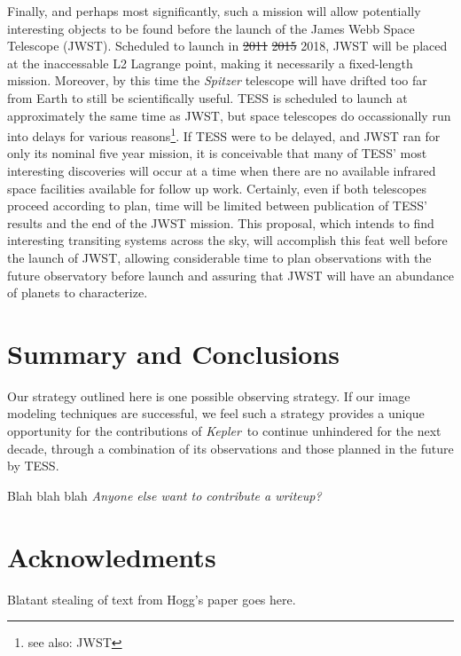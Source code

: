\documentclass[12pt, preprint]{aastex}
\newcommand{\observatory}[1]{\textsl{#1}}
\newcommand{\kepler}{\observatory{Kepler}}
\newcommand{\Kepler}{\kepler}
\begin{document}
Finally, and perhaps most significantly, such a mission will allow potentially 
 interesting objects to be found before the launch of the James Webb Space 
 Telescope (JWST). 
Scheduled to launch in \sout{2011} \sout{2015} 2018, JWST will be placed at 
 the inaccessable L2 Lagrange point, making it necessarily a fixed-length 
 mission. 
Moreover, by this time the \textit{Spitzer} telescope will have drifted too 
 far from Earth to still be scientifically useful.
TESS is scheduled to launch at approximately the same time as JWST, but 
 space telescopes do occassionally run into delays for various reasons\footnote{see also: JWST}.
If TESS were to be delayed, and JWST ran for only its nominal five year mission, it is conceivable that many of TESS' most interesting discoveries will occur 
 at a time when there are no available infrared space facilities available for 
 follow up work.
Certainly, even if both telescopes proceed according to plan, time will be 
 limited between publication of TESS' results and the end of the JWST mission.
This proposal, which intends to find interesting transiting systems across 
 the sky, will accomplish this feat well before the launch of JWST, allowing 
 considerable time to plan observations with the future observatory before 
 launch and assuring that JWST will have an abundance of planets to 
 characterize.

\section{Summary and Conclusions}
Our strategy outlined here is one possible observing strategy. 
If our image  modeling techniques are successful, we feel such a strategy 
 provides a unique opportunity for the contributions of \Kepler\ to continue 
 unhindered for the next decade, through a combination of its observations and 
 those planned in the future by TESS. 

Blah blah blah \textit{Anyone else want to contribute a writeup?}

\section{Acknowledments}
Blatant stealing of text from Hogg's paper goes here.
\end{document}
